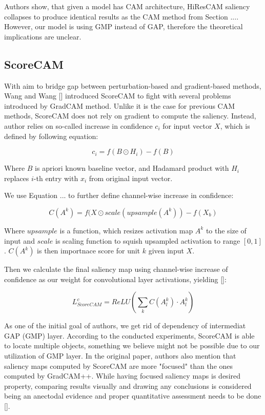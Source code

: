 Authors show, that given a model has CAM architecture, HiResCAM saliency collapses to produce identical results as the CAM method from Section .... However, our model is using GMP instead of GAP, therefore the theoretical implications are unclear.

\subsection{ScoreCAM}

With aim to bridge gap between perturbation-based and gradient-based methods, Wang and Wang [] introduced ScoreCAM to fight with several problems introduced by GradCAM method. Unlike it is the case for previous CAM methods, ScoreCAM does not rely on gradient to compute the saliency. Instead, author relies on so-called increase in confidence $c_i$ for input vector $X$, which is defined by following equation:

\begin{equation}
    c_i = f(B \odot H_i) - f(B)
\end{equation}

Where $B$ is apriori known baseline vector, and Hadamard product with $H_i$ replaces $i$-th entry with $x_i$ from original input vector.

We use Equation ... to further define channel-wise increase in confidence:

\begin{equation}
    C(A^k) = f(X \odot scale(upsample(A^k)) - f(X_b)
\end{equation}

Where $upsample$ is a function, which resizes activation map $A^k$ to the size of input and $scale$ is scaling function to squish upsampled activation to range $[0, 1]$. $C(A^k)$ is then importnace score for unit $k$ given input $X$.

Then we calculate the final saliency map using channel-wise increase of confidence as our weight for convolutional layer activations, yielding []:

\begin{equation}
    L_{ScoreCAM}^c = ReLU(\sum_k C(A^k_l) \cdot A^k_l)
\end{equation}

As one of the initial goal of authors, we get rid of dependency of intermediat GAP (GMP) layer. According to the conducted experiments, ScoreCAM is able to locate multiple objects, something we believe might not be possible due to our utilization of GMP layer. In the original paper, authors also mention that saliency maps computed by ScoreCAM are more "focused" than the ones computed by GradCAM++. While having focused saliency maps is desired property, comparing results visually and drawing any conclusions is considered being an anectodal evidence and proper quantitative assessment needs to be done [].


